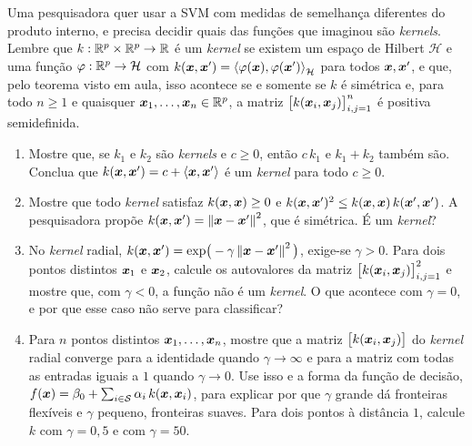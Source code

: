 \documentclass[11pt,a4paper]{article}
\begin{document}
\begin{exercicio}
Uma pesquisadora quer usar a SVM com medidas de semelhança diferentes do produto
interno, e precisa decidir quais das funções que imaginou são \emph{kernels}. Lembre
que $k:\mathbb{R}^p\times\mathbb{R}^p\to\mathbb{R}$ é um \emph{kernel} se existem um espaço de Hilbert
$\mathcal H$ e uma função $\varphi:\mathbb{R}^p\to\mathcal H$ com
$k(\bm{x},\bm{x}')=\left\langle \varphi(\bm{x}), \varphi(\bm{x}') \right\rangle_{\mathcal H}$ para todos $\bm{x},\bm{x}'$, e que,
pelo teorema visto em aula, isso acontece se e somente se $k$ é simétrica e, para todo
$n\ge1$ e quaisquer $\bm{x}_1,\dots,\bm{x}_n\in\mathbb{R}^p$, a matriz
$\big[k(\bm{x}_i,\bm{x}_j)\big]_{i,j=1}^n$ é positiva semidefinida.
\begin{enumerate}[label=(\alph*),leftmargin=1.1cm]
  \item Mostre que, se $k_1$ e $k_2$ são \emph{kernels} e $c\ge0$, então $c\,k_1$ e
        $k_1+k_2$ também são. Conclua que $k(\bm{x},\bm{x}')=c+\left\langle \bm{x}, \bm{x}' \right\rangle$ é um
        \emph{kernel} para todo $c\ge0$.
  \item Mostre que todo \emph{kernel} satisfaz $k(\bm{x},\bm{x})\ge0$ e
        $k(\bm{x},\bm{x}')^2\le k(\bm{x},\bm{x})\,k(\bm{x}',\bm{x}')$. A pesquisadora propõe
        $k(\bm{x},\bm{x}')=\left\lVert \bm{x}-\bm{x}' \right\rVert^2$, que é simétrica. É um \emph{kernel}?
  \item No \emph{kernel} radial, $k(\bm{x},\bm{x}')=\exp\!\big(-\gamma\left\lVert \bm{x}-\bm{x}' \right\rVert^2\big)$,
        exige-se $\gamma>0$. Para dois pontos distintos $\bm{x}_1$ e $\bm{x}_2$, calcule os
        autovalores da matriz $\big[k(\bm{x}_i,\bm{x}_j)\big]_{i,j=1}^2$ e mostre que, com
        $\gamma<0$, a função não é um \emph{kernel}. O que acontece com $\gamma=0$, e
        por que esse caso não serve para classificar?
  \item Para $n$ pontos distintos $\bm{x}_1,\dots,\bm{x}_n$, mostre que a matriz
        $\big[k(\bm{x}_i,\bm{x}_j)\big]$ do \emph{kernel} radial converge para a identidade
        quando $\gamma\to\infty$ e para a matriz com todas as entradas iguais a $1$
        quando $\gamma\to0$. Use isso e a forma da função de decisão,
        $f(\bm{x})=\beta_0+\sum_{i\in\mathcal S}\alpha_i\,k(\bm{x},\bm{x}_i)$, para explicar por
        que $\gamma$ grande dá fronteiras flexíveis e $\gamma$ pequeno, fronteiras
        suaves. Para dois pontos à distância $1$, calcule $k$ com $\gamma=0{,}5$ e com
        $\gamma=50$.
\end{enumerate}
\end{exercicio}
\end{document}
